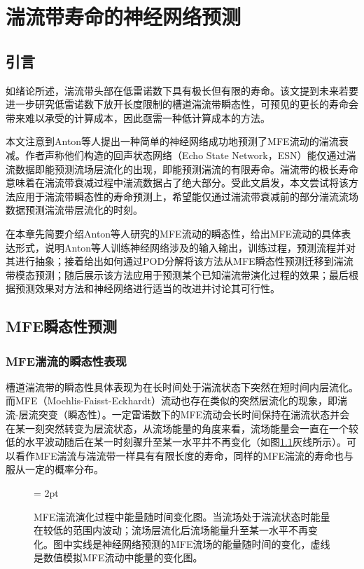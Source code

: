 \chapter{湍流带寿命的神经网络预测}
\section{引言}
如绪论所述，湍流带头部在低雷诺数下具有极长但有限的寿命\cite{xu_song_2022}。该文提到未来若要进一步研究低雷诺数下放开长度限制的槽道湍流带瞬态性，可预见的更长的寿命会带来难以承受的计算成本，因此亟需一种低计算成本的方法。

本文注意到Anton等人提出一种简单的神经网络成功地预测了MFE流动的湍流衰减\cite{Anton2023}。作者声称他们构造的回声状态网络（Echo State Network，ESN）能仅通过湍流数据即能预测流场层流化的出现，即能预测湍流的有限寿命。湍流带的极长寿命意味着在湍流带衰减过程中湍流数据占了绝大部分。受此文启发，本文尝试将该方法应用于湍流带瞬态性的寿命预测上，希望能仅通过湍流带衰减前的部分湍流流场数据预测湍流带层流化的时刻。

在本章先简要介绍Anton等人\cite{Anton2023}研究的MFE流动的瞬态性，给出MFE流动的具体表达形式，说明Anton等人训练神经网络涉及的输入输出，训练过程，预测流程并对其进行抽象；接着给出如何通过POD分解将该方法从MFE瞬态性预测迁移到湍流带模态预测；随后展示该方法应用于预测某个已知湍流带演化过程的效果；最后根据预测效果对方法和神经网络进行适当的改进并讨论其可行性。

\section{MFE瞬态性预测}
\subsection{MFE湍流的瞬态性表现}
槽道湍流带的瞬态性具体表现为在长时间处于湍流状态下突然在短时间内层流化。而MFE（Moehlis-Faisst-Eckhardt）流动也存在类似的突然层流化的现象，即湍流-层流突变（瞬态性）。一定雷诺数下的MFE流动会长时间保持在湍流状态并会在某一刻突然转变为层流状态，从流场能量的角度来看，流场能量会一直在一个较低的水平波动随后在某一时刻骤升至某一水平并不再变化（如图\ref{fig:MFE}灰线所示）。可以看作MFE湍流与湍流带一样具有有限长度的寿命，同样的MFE湍流的寿命也与服从一定的概率分布。
\begin{figure}[H]
	\subfigbottomskip = 2pt
	\begin{minipage}[h]{\linewidth}
	\centering
	\end{minipage}
	\quad
	\caption{MFE湍流演化过程中能量随时间变化图。当流场处于湍流状态时能量在较低的范围内波动；流场层流化后流场能量升至某一水平不再变化。图中实线是神经网络预测的MFE流场的能量随时间的变化，虚线是数值模拟MFE流动中能量的变化图。}
\label{fig:MFE}
\end{figure}
